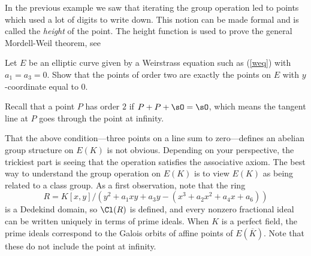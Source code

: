 \begin{remark}
  In the previous example we saw that iterating the
  group operation led to points which used a lot of digits
  to write down. This notion can be made formal and is called
  the \emph{height} of the point. The height function is used
  to prove the general Mordell-Weil theorem, see
  \cite[Ch.~VIII.4]{silverman:aec}
\end{remark}

\begin{exercise}\label{ex:ec2torsion}
  Let $E$ be an elliptic curve given by a
  Weirstrass equation such as (\ref{weq}) with $a_1=a_3=0$.
  Show that the points of order two are exactly
  the points on $E$ with $y$-coordinate equal to
  $0$.

  \begin{hint}
    Recall that a point $P$ has order $2$ if
    $P + P + \sO = \sO$, which means the tangent line
    at $P$ goes through the point at infinity.
  \end{hint}
\end{exercise}

That the above condition---three points on a line sum to
zero---defines an abelian group structure on $E(K)$ is not obvious.
Depending on your perspective, the trickiest part is seeing that the
operation satisfies the associative axiom.  The best way to understand
the group operation on $E(K)$ is to view $E(K)$ as being related to a
class group.  As a first observation, note that the ring
\[
  R = K[x,y]/(y^2 +a_1 xy + a_3 y - (x^3 + a_2 x^2 + a_4 x + a_6))
\]
is a Dedekind domain, so $\Cl(R)$ is defined, and every nonzero
fractional ideal can be written uniquely in terms of prime ideals.
When $K$ is a perfect field, the prime ideals correspond to the Galois
orbits of affine points of $E(\overline{K})$.
Note that these do not include the point at infinity.

